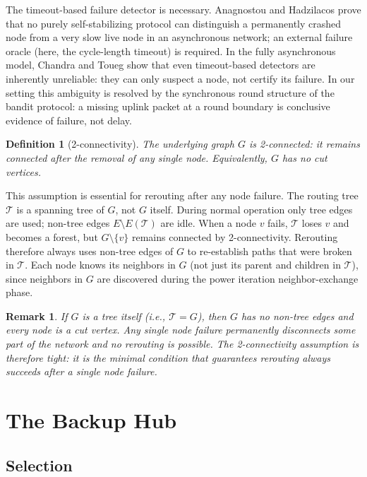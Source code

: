 \documentclass{article}
\newtheorem{definition}{Definition}
\newtheorem{remark}{Remark}
\begin{document}
The timeout-based failure detector is necessary. Anagnostou and Hadzilacos
\cite{anagnostou1993} prove that no purely self-stabilizing protocol can distinguish a
permanently crashed node from a very slow live node in an asynchronous network; an
external failure oracle (here, the cycle-length timeout) is required. In the fully
asynchronous model, Chandra and Toueg \cite{chandratoueg1996} show that even
timeout-based detectors are inherently unreliable: they can only suspect a node, not
certify its failure. In our setting this ambiguity is resolved by the synchronous round
structure of the bandit protocol: a missing uplink packet at a round boundary is
conclusive evidence of failure, not delay.

\begin{definition}[2-connectivity]
\label{def:2conn}
    The underlying graph $G$ is \emph{2-connected}: it remains connected after the
    removal of any single node. Equivalently, $G$ has no cut vertices.
\end{definition}

This assumption is essential for rerouting after any node failure. The routing tree
$\mathcal{T}$ is a spanning tree of $G$, not $G$ itself. During normal operation only
tree edges are used; non-tree edges $E \setminus E(\mathcal{T})$ are idle. When a node
$v$ fails, $\mathcal{T}$ loses $v$ and becomes a forest, but $G \setminus \{v\}$ remains
connected by 2-connectivity. Rerouting therefore always uses non-tree edges of $G$ to
re-establish paths that were broken in $\mathcal{T}$. Each node knows its neighbors in
$G$ (not just its parent and children in $\mathcal{T}$), since neighbors in $G$ are
discovered during the power iteration neighbor-exchange phase.

\begin{remark}
    If $G$ is a tree itself (i.e., $\mathcal{T} = G$), then $G$ has no non-tree edges
    and every node is a cut vertex. Any single node failure permanently disconnects some
    part of the network and no rerouting is possible. The 2-connectivity assumption is
    therefore tight: it is the minimal condition that guarantees rerouting always succeeds
    after a single node failure.
\end{remark}

\section{The Backup Hub}

\subsection{Selection}
\end{document}
